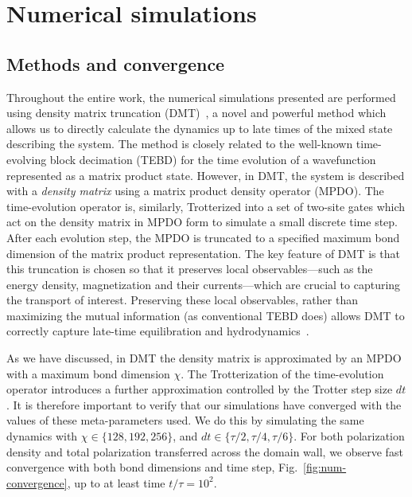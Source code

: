\documentclass[
 reprint,
 superscriptaddress,
 amsmath,amssymb,
 aps,
 pra,
]{revtex4-2}
\begin{document}

\section{\label{sec:numerics}Numerical simulations}

\subsection{Methods and convergence}
Throughout the entire work, the numerical simulations presented are performed using density matrix truncation (DMT)~\cite{White2018,Ye2020}, a novel and powerful method which allows us to directly calculate the dynamics up to late times of the mixed state describing the system. 
The method is closely related to the well-known time-evolving block decimation (TEBD) for the time evolution of a wavefunction represented as a matrix product state. 
However, in DMT, the system is described with a \emph{density matrix} using a matrix product density operator (MPDO). 
The time-evolution operator is, similarly, Trotterized into a set of two-site gates which act on the density matrix in MPDO form to simulate a small discrete time step. 
After each evolution step, the MPDO is truncated to a specified maximum bond dimension of the matrix product representation. 
The key feature of DMT is that this truncation is chosen so that it preserves local observables---such as the energy density, magnetization and their currents---which are crucial to capturing the transport of interest. 
Preserving these local observables, rather than maximizing the mutual information (as conventional TEBD does) allows DMT to correctly capture late-time equilibration and hydrodynamics~\cite{Ye2020}.


As we have discussed, in DMT the density matrix is approximated by an MPDO with a maximum bond dimension $\chi$. The Trotterization of the time-evolution operator introduces a further approximation controlled by the Trotter step size $dt$. It is therefore important to verify that our simulations have converged with the values of these meta-parameters used. We do this by simulating the same dynamics with $\chi\in \{128,192,256\}$, and $dt \in \{\tau/2, \tau/4, \tau/6\}$. For both polarization density and total polarization transferred across the domain wall, we observe fast convergence with both bond dimensions and time step, Fig.~\ref{fig:num-convergence}, up to at least time $t/\tau=10^2$.
\end{document}

